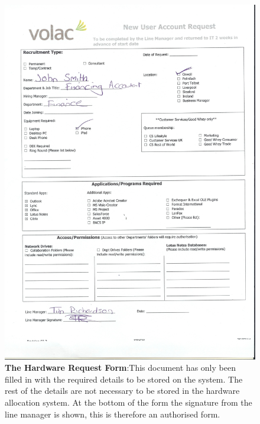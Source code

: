 \begin{figure}[H]
\includegraphics[width=.9\textwidth,height=.9\textheight,keepaspectratio]{HardwareRequestForm.jpg}
\caption{\textbf{The Hardware Request Form}:This document has only been filled in with the required details to be stored on the system. The rest of the details are not necessary to be stored in the hardware allocation system. At the bottom of the form the signature from the line manager is shown, this is therefore an authorised form.} \label{HardwareRequestForm}
\end{figure}

